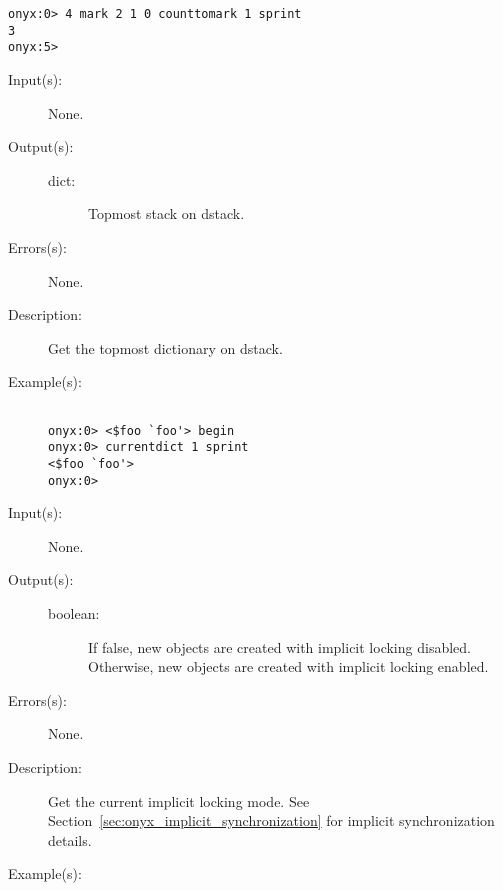 \begin{description}
\begin{description}
\begin{verbatim}
onyx:0> 4 mark 2 1 0 counttomark 1 sprint
3
onyx:5>
		\end{verbatim}
	\end{description}
\label{systemdict:currentdict}
\item[{\onyxop{--}{currentdict}{dict}}: ]
	\begin{description}\item[]
	\item[Input(s): ] None.
	\item[Output(s): ]
		\begin{description}\item[]
		\item[dict: ]
			Topmost stack on dstack.
		\end{description}
	\item[Errors(s): ] None.
	\item[Description: ]
		Get the topmost dictionary on dstack.
	\item[Example(s): ]\begin{verbatim}

onyx:0> <$foo `foo'> begin 
onyx:0> currentdict 1 sprint
<$foo `foo'>
onyx:0>
		\end{verbatim}
	\end{description}
\label{systemdict:currentlocking}
\item[{\onyxop{--}{currentlocking}{boolean}}: ]
	\begin{description}\item[]
	\item[Input(s): ] None.
	\item[Output(s): ]
		\begin{description}\item[]
		\item[boolean: ]
			If false, new objects are created with implicit locking
			disabled.  Otherwise, new objects are created with
			implicit locking enabled.
		\end{description}
	\item[Errors(s): ] None.
	\item[Description: ]
		Get the current implicit locking mode.  See
		Section~\ref{sec:onyx_implicit_synchronization} for implicit
		synchronization details.
	\item[Example(s): ]\begin{verbatim}


\end{verbatim}
\end{description}
\end{description}
